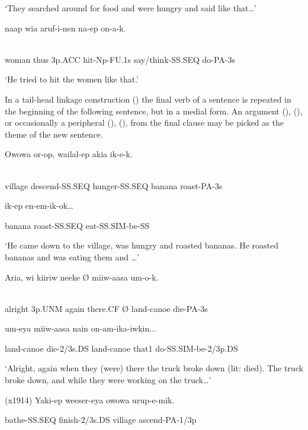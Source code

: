 `They searched around for food and were hungry and said like that{\dots}'

\ea%
\label{ex:x1911}
\gll {}  naap  wia  aruf-i-nen  na-ep  on-a-k. \\
      \\
\glt
\z

woman  thus  3p.ACC  hit-Np-FU.1s  say/think-SS.SEQ  do-PA-3s

`He tried to hit the women like that.'

In a tail-head linkage construction () the final verb of a sentence is repeated in the beginning of the following sentence, but in a medial form. An argument (), (), or occasionally a peripheral (), (), from the final clause may be picked as the theme of the new sentence.

\ea%
\label{ex:x1912}
\gll Owowa  or-op,  wailal-ep  akia  ik-e-k.  \\
      \\
\glt
\z

village  descend-SS.SEQ  hunger-SS.SEQ  banana  roast-PA-3s  

  ik-ep  en-em-ik-ok{\dots}

banana  roast-SS.SEQ  eat-SS.SIM-be-SS

`He came down to the village, was hungry and roasted bananas. He roasted bananas and was eating them and {\dots}'

\ea%
\label{ex:x1913}
\gll Aria,  wi  kiiriw  neeke  {\O}  miiw-aasa  um-o-k.  \\
      \\
\glt
\z

alright  3p.UNM  again  there.CF  {\O}  land-canoe  die-PA-3s

  um-eya  miiw-aasa  nain  on-am-ika-iwkin...

land-canoe  die-2/3s.DS  land-canoe  that1  do-SS.SIM-be-2/3p.DS

`Alright, again when they (were) there the truck broke down (lit: died). The truck broke down, and while they were working on the truck{\dots}'

  (x1914)  Yaki-ep  weeser-eya  owowa  urup-e-mik.

bathe-SS.SEQ  finish-2/3s.DS  village  ascend-PA-1/3p  

